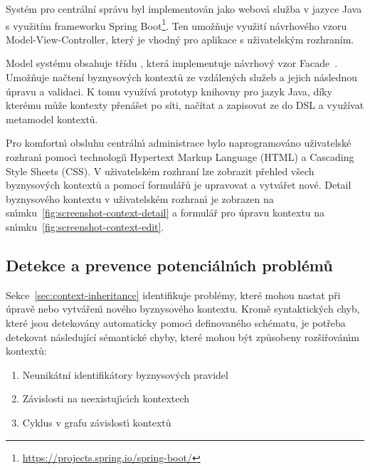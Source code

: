 Systém pro centrální správu byl implementován jako webová služba v jazyce Java
s využitím frameworku Spring Boot\footnote{\url{https://projects.spring.io/spring-boot/}}.
Ten umožňuje využití návrhového vzoru Model-View-Controller, který je vhodný
pro aplikace s uživatelským rozhraním.

Model systému obsahuje třídu , která implementuje
návrhový vzor Facade~\cite{fowler2002patterns}. Umožňuje načtení byznysových
kontextů ze vzdálených služeb a jejich následnou úpravu a validaci. K tomu využívá
prototyp knihovny pro jazyk Java, díky kterému může kontexty přenášet po síti,
načítat a zapisovat ze do \gls{DSL} a využívat metamodel kontextů.

Pro komfortn\'{\i} obsluhu centráln\'{\i} administrace bylo naprogramováno
uživatelské rozhran\'{\i} pomoc\'{\i} technologi\'{\i} Hypertext Markup Language
(HTML) a Cascading Style Sheets (\gls{CSS}). V uživatelském rozhraní lze zobrazit
přehled všech byznysových kontextů a pomocí formulářů je upravovat a vytvářet nové.
Detail byznysového kontextu v uživatelském rozhran\'{\i} je zobrazen
na sn\'{\i}mku~\ref{fig:screenshot-context-detail} a formulář pro úpravu kontextu
na sn\'{\i}mku~\ref{fig:screenshot-context-edit}.

\subsection{Detekce a prevence potenciáln\'{\i}ch problémů}

Sekce~\ref{sec:context-inheritance} identifikuje problémy, které
mohou nastat při úpravě nebo vytvářen\'{\i} nového byznysového kontextu.
Kromě syntaktick\'ych chyb, které jsou detekovány automaticky pomoc\'{\i} definovaného schématu,
je potřeba detekovat následující sémantické chyby, které mohou b\'yt způsobeny rozšiřován\'{\i}m kontextů:
\begin{enumerate}[label=\alph*)]
    \item Neunikátní identifikátory byznysových pravidel
    \item Závislosti na neexistuj\'{\i}c\'{\i}ch kontextech
    \item Cyklus v grafu závislost\'{\i} kontextů
\end{enumerate}

